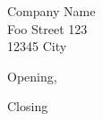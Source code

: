 \documentclass[11pt, a4paper, foldmarks=false]{scrlttr2}
\begin{document}
\begin{letter}{Company Name\\
               Foo Street 123\\
               12345 City}

\opening{Opening,}

\closing{Closing}
 
\encl{}

\end{letter}
\end{document}
